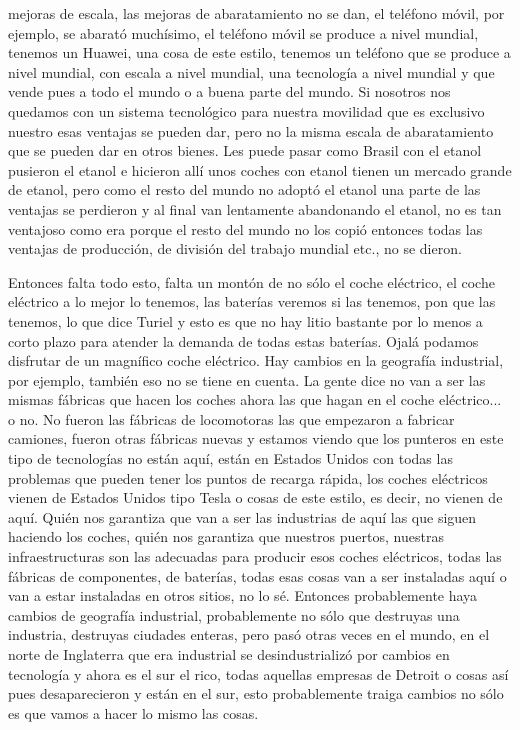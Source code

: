 mejoras de escala, las mejoras de abaratamiento no se dan, el teléfono móvil, por ejemplo, se abarató muchísimo, el teléfono móvil se produce a nivel mundial, tenemos un Huawei, una cosa de este estilo, tenemos un teléfono que se produce a nivel mundial, con escala a nivel mundial, una tecnología a nivel mundial y que vende pues a todo el mundo o a buena parte del mundo. Si nosotros nos quedamos con un sistema tecnológico para nuestra movilidad que es exclusivo nuestro esas ventajas se pueden dar, pero no la misma escala de abaratamiento que se pueden dar en otros bienes. Les puede pasar como Brasil con el etanol pusieron el etanol e hicieron allí unos coches con etanol tienen un mercado grande de etanol, pero como el resto del mundo no adoptó el etanol una parte de las ventajas se perdieron y al final van lentamente abandonando el etanol, no es tan ventajoso como era porque el resto del mundo no los copió entonces todas las ventajas de producción, de división del trabajo mundial etc., no se dieron.

Entonces falta todo esto, falta un montón de no sólo el coche eléctrico, el coche eléctrico a lo mejor lo tenemos, las baterías veremos si las tenemos, pon que las tenemos, lo que dice Turiel y esto es que no hay litio bastante por lo menos a corto plazo para atender la demanda de todas estas baterías. Ojalá podamos disfrutar de un magnífico coche eléctrico. Hay cambios en la geografía industrial, por ejemplo, también eso no se tiene en cuenta. La gente dice no van a ser las mismas fábricas que hacen los coches ahora las que hagan en el coche eléctrico... o no. No fueron las fábricas de locomotoras las que empezaron a fabricar camiones, fueron otras fábricas nuevas y estamos viendo que los punteros en este tipo de tecnologías no están aquí, están en Estados Unidos con todas las problemas que pueden tener los puntos de recarga rápida, los coches eléctricos vienen de Estados Unidos tipo Tesla o cosas de este estilo, es decir, no vienen de aquí. Quién nos garantiza que van a ser las industrias de aquí las que siguen haciendo los coches, quién nos garantiza que nuestros puertos, nuestras infraestructuras son las adecuadas para producir esos coches eléctricos, todas las fábricas de componentes, de baterías, todas esas cosas van a ser instaladas aquí o van a estar instaladas en otros sitios, no lo sé. Entonces probablemente haya cambios de geografía industrial, probablemente no sólo que destruyas una industria, destruyas ciudades enteras, pero pasó otras veces en el mundo, en el norte de Inglaterra que era industrial se desindustrializó por cambios en tecnología y ahora es el sur el rico, todas aquellas empresas de Detroit o cosas así pues desaparecieron y están en el sur, esto probablemente traiga cambios no sólo es que vamos a hacer lo mismo las cosas.

